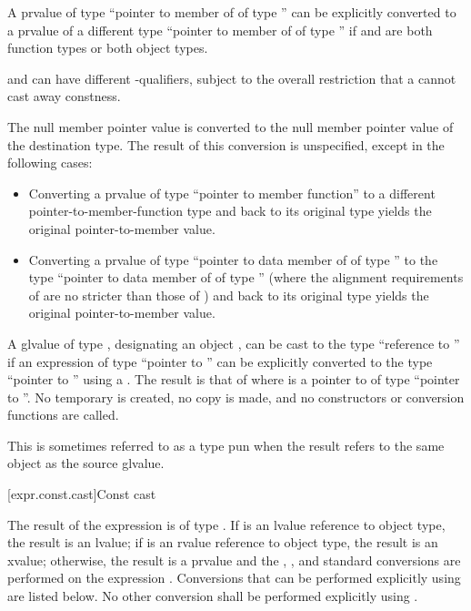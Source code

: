 \pnum
{}%
%
A prvalue of type ``pointer to member of  of type ''
can be explicitly converted to a prvalue of a different type ``pointer to member of
 of type '' if  and  are both
function types or both object types.
\begin{footnote}
 and  can have
different \cv-qualifiers, subject to
the overall restriction that a  cannot cast away
constness.
\end{footnote}
The null member pointer value is converted to the
null member pointer value of the destination type. The result of this
conversion is unspecified, except in the following cases:
\begin{itemize}
\item Converting a prvalue of type ``pointer to member function'' to a
different pointer-to-member-function type and back to its original type
yields the original pointer-to-member value.

\item Converting a prvalue of type ``pointer to data member of 
of type '' to the type ``pointer to data member of 
of type '' (where the alignment requirements of  are
no stricter than those of ) and back to its original type
yields the original pointer-to-member value.
\end{itemize}

\pnum
{}%
%
%
A glvalue of type ,
designating an object ,
can be cast to the type ``reference to ''
if an expression of type ``pointer to ''
can be explicitly converted to the type ``pointer to ''
using a .
The result is that of 
where  is a pointer to 
of type ``pointer to ''.
No temporary is created, no copy is made, and
no constructors or conversion
functions are called.
\begin{footnote}
This is sometimes referred to as a type pun
when the result refers to the same object as the source glvalue.
\end{footnote}

[expr.const.cast]{Const cast}

\pnum
{}%
%
The result of the expression  is of type
. If  is an lvalue reference to object type, the result is an
lvalue;
if  is an rvalue reference to object type, the result is an xvalue;
otherwise, the result is a prvalue and the
, ,
and  standard conversions are
performed on the expression . Conversions that can be performed explicitly using
 are listed below. No other conversion shall be
performed explicitly using .

